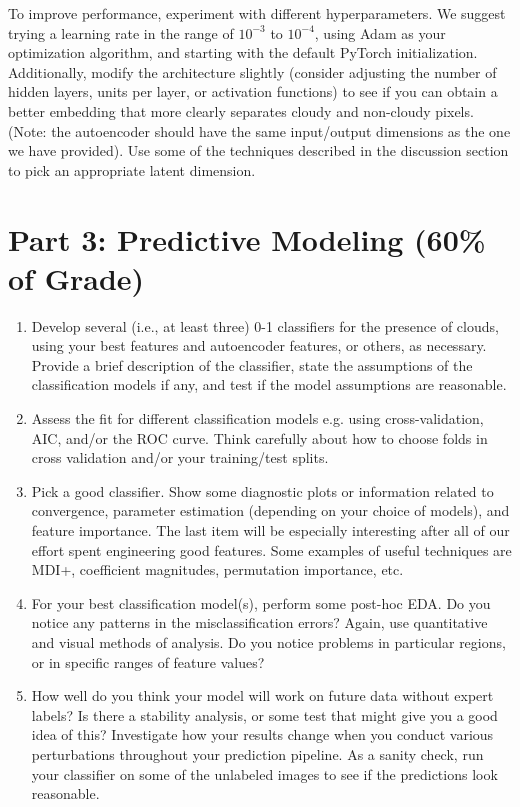 \documentclass[letterpaper,12pt]{article}
\begin{document}
To improve performance, experiment with different hyperparameters. We suggest trying a learning rate in the range of $10^{-3}$ to $10^{-4}$, using Adam as your optimization algorithm, and starting with the default PyTorch initialization.  
Additionally, modify the architecture slightly (consider adjusting the number of hidden layers, units per layer, or activation functions) to see if you can obtain a better embedding that more clearly separates cloudy and non-cloudy pixels. 
(Note: the autoencoder should have the same input/output dimensions as the one we have provided). 
Use some of the techniques described in the discussion section to pick an appropriate latent dimension.

\section*{Part 3: Predictive Modeling (60\% of Grade)}
\begin{enumerate}
    \item Develop several (i.e., at least three) 0-1 classifiers for the presence of clouds, using your best features and autoencoder features, or others, as necessary. Provide a brief description of the classifier, state the assumptions of the classification models if any, and test if the model assumptions are reasonable.
    
    \item Assess the fit for different classification models e.g. using cross-validation, AIC, and/or the ROC curve. Think carefully about how to choose folds in cross validation and/or your training/test splits.
    
    \item Pick a good classifier. Show some diagnostic plots or information related to convergence, parameter estimation (depending on your choice of models), and feature importance. The last item will be especially interesting after all of our effort spent engineering good features. Some examples of useful techniques are MDI+, coefficient magnitudes, permutation importance, etc.
    
    \item For your best classification model(s), perform some post-hoc EDA. Do you notice any patterns in the misclassification errors? Again, use quantitative and visual methods of analysis. Do you notice problems in particular regions, or in specific ranges of feature values?
    
    \item How well do you think your model will work on future data without expert labels? Is there a stability analysis, or some test that might give you a good idea of this? Investigate how your results change when you conduct various perturbations throughout your prediction pipeline. As a sanity check, run your classifier on some of the unlabeled images to see if the predictions look reasonable.
\end{enumerate}
\end{document}
